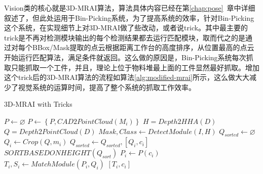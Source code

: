 Vision类的核心就是3D-MRAI算法，算法具体内容已经在第\ref{chap:pose}~章中详细叙述了，但此处运用于Bin-Picking系统，为了提高系统的效率，针对Bin-Picking这个系统，在实现细节上对3D-MRAI做了些改动，或者说trick。其中最主要的trick是不再对检测模块输出的每个检测结果都去运行匹配模块，取而代之的是通过对每个BBox/Mask提取的点云根据距离工作台的高度排序，从位置最高的点云开始运行匹配算法，满足条件就返回。这么做的原因是，Bin-Picking系统每次抓取只能抓取一个工件，并且，理论上位于物料堆最上面的工件显然最好抓取。增加这个trick后的3D-MRAI算法的流程如算法\ref{alg:modified-mrai}所示，这么做大大减少了视觉系统的运算时间，提高了整个系统的抓取工作效率。%


\begin{algorithm}
  \caption{3D-MRAI with Tricks}
  \label{alg:modified-mrai}
  $P\leftarrow \varnothing$\;
   {
    $P\leftarrow \left\{P, CAD2PointCloud(M_i)\right\}$\;
  }
  $H = Depth2HHA(D)$\;
  $Q = Depth2PointCloud(D)$\;
  $Mask, Class \leftarrow DetectModule(I, H)$\;
  $Q_{sorted}\leftarrow \varnothing$\;
   {
    $Q_i \leftarrow Crop(Q, m_i)$\;
    $Q_{sorted}\leftarrow {Q_{sorted}, [Q_i, c_i]}$\;
  }
  $SORTBASEDONHEIGHT(Q_{sort})$\;
   {
    $P_i \leftarrow P(c_i)$\;
    $T_i,S_i\leftarrow MatchModule(P_i, Q_i)$\;
     {
      \Return $\left[T_i, c_i\right]$\;
    }
  }
\end{algorithm}

